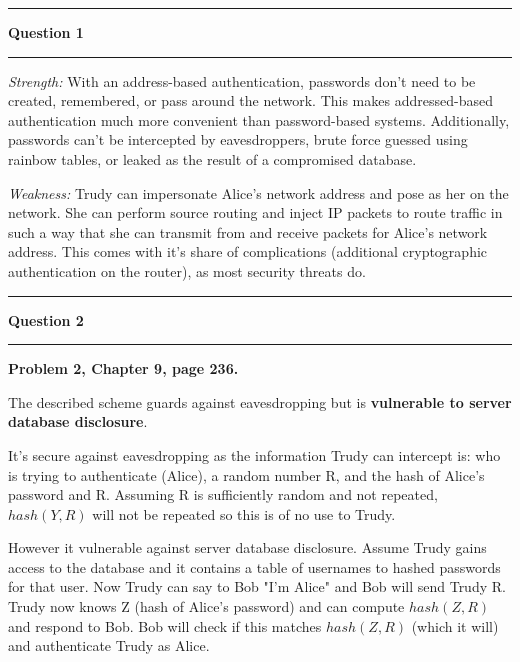 \documentclass[11pt]{article}
\newcommand\question[2]{\vspace{.25in}\hrule\textbf{#1}\vspace{.5em}\hrule\vspace{.10in}}
\renewcommand\part[1]{\vspace{.10in}\textbf{(#1)}}
\begin{document}
\raggedright
\newcommand\NAME{Jake Pitkin}  %
\newcommand\UID{u0891770}     %
\newcommand\HWNUM{4}              %

\question{Question 1}

\textbf{Suppose a computer is authenticated based on its IP address (no passwords are used). Identify one strength and one weakness of such an authentication mechanism.}

\textit{Strength:} With an address-based authentication, passwords don't need to be created, remembered, or pass around the network. This makes addressed-based authentication much more convenient than password-based systems. Additionally, passwords can't be intercepted by eavesdroppers, brute force guessed using rainbow tables, or leaked as the result of a compromised database.

\textit{Weakness:} Trudy can impersonate Alice's network address and pose as her on the network. She can perform source routing and inject IP packets to route traffic in such a way that she can transmit from and receive packets for Alice's network address. This comes with it's share of complications (additional cryptographic authentication on the router), as most security threats do.

\question{Question 2}

\part{a} \textbf{Problem 2, Chapter 9, page 236.}

The described scheme guards against eavesdropping but is \textbf{vulnerable to server database disclosure}.

It's secure against eavesdropping as the information Trudy can intercept is: who is trying to authenticate (Alice), a random number R, and the hash of Alice's password and R. Assuming R is sufficiently random and not repeated, $hash(Y,R)$ will not be repeated so this is of no use to Trudy.

However it vulnerable against server database disclosure. Assume Trudy gains access to the database and it contains a table of usernames to hashed passwords for that user. Now Trudy can say to Bob "I'm Alice" and Bob will send Trudy R. Trudy now knows Z (hash of Alice's password) and can compute $hash(Z,R)$ and respond to Bob. Bob will check if this matches $hash(Z,R)$ (which it will) and authenticate Trudy as Alice. 
\end{document}
